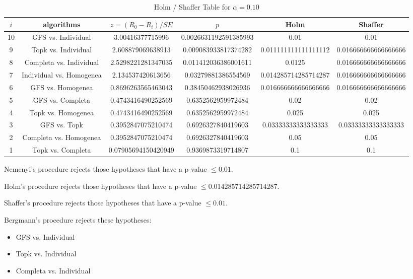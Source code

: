 \documentclass[a4paper,10pt]{article}
\begin{document}
\begin{landscape}
\begin{table}[!htp]
\centering\tiny
\caption{Holm / Shaffer Table for $\alpha=0.10$}
\begin{tabular}{cccccc}
$i$&algorithms&$z=(R_0 - R_i)/SE$&$p$&Holm&Shaffer\\
\hline
10&GFS vs. Individual&3.00416377715996&0.0026631192591385993&0.01&0.01\\
9&Topk vs. Individual&2.608879069638913&0.009083933817374282&0.011111111111111112&0.016666666666666666\\
8&Completa vs. Individual&2.5298221281347035&0.011412036386001611&0.0125&0.016666666666666666\\
7&Individual vs. Homogenea&2.134537420613656&0.03279881386554569&0.014285714285714287&0.016666666666666666\\
6&GFS vs. Homogenea&0.8696263565463043&0.38450462938026936&0.016666666666666666&0.016666666666666666\\
5&GFS vs. Completa&0.4743416490252569&0.6352562959972484&0.02&0.02\\
4&Topk vs. Homogenea&0.4743416490252569&0.6352562959972484&0.025&0.025\\
3&GFS vs. Topk&0.3952847075210474&0.6926327840419603&0.03333333333333333&0.03333333333333333\\
2&Completa vs. Homogenea&0.3952847075210474&0.6926327840419603&0.05&0.05\\
1&Topk vs. Completa&0.07905694150420949&0.9369873319714807&0.1&0.1\\
\hline
\end{tabular}
\end{table}
Nemenyi's procedure rejects those hypotheses that have a p-value $\le0.01$.


Holm's procedure rejects those hypotheses that have a p-value $\le0.014285714285714287$.


Shaffer's procedure rejects those hypotheses that have a p-value $\le0.01$.


Bergmann's procedure rejects these hypotheses:


\begin{itemize}


\item GFS vs. Individual
\item Topk vs. Individual
\item Completa vs. Individual
\end{itemize}



\end{landscape}
\end{document}
